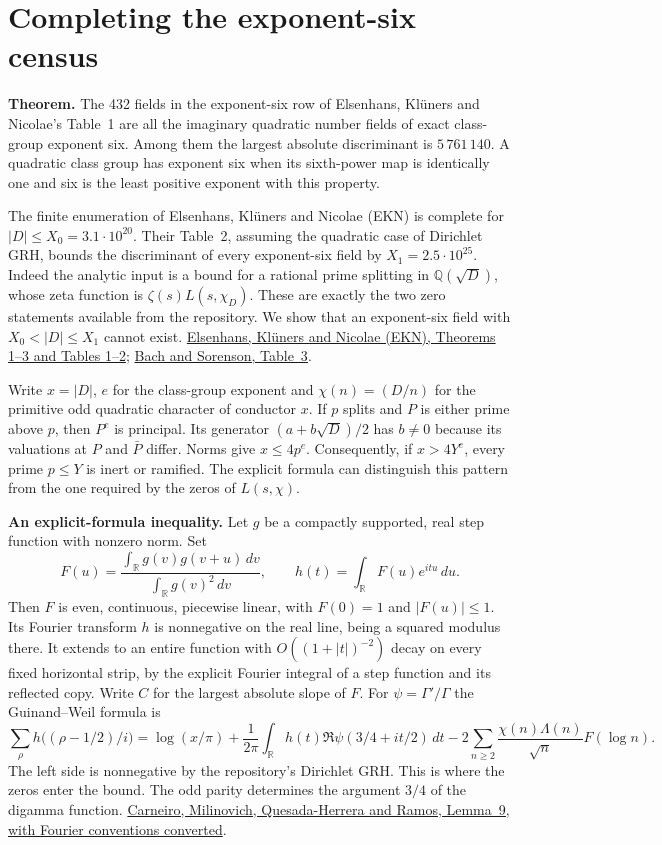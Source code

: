 \section{Completing the exponent-six census}
\label{sec:zero-test}
\textbf{Theorem.} The 432 fields in the exponent-six row of Elsenhans, Kl\"uners and Nicolae's Table~1 are all the imaginary quadratic number fields of exact class-group exponent six. Among them the largest absolute discriminant is $5\,761\,140$. A quadratic class group has exponent six when its sixth-power map is identically one and six is the least positive exponent with this property.

The finite enumeration of Elsenhans, Kl\"uners and Nicolae (EKN) is complete for $|D|\le X_0=3.1\cdot10^{20}$. Their Table~2, assuming the quadratic case of Dirichlet GRH, bounds the discriminant of every exponent-six field by $X_1=2.5\cdot10^{25}$. Indeed the analytic input is a bound for a rational prime splitting in $\mathbb Q(\sqrt D)$, whose zeta function is $\zeta(s)L(s,\chi_D)$. These are exactly the two zero statements available from the repository. We show that an exponent-six field with $X_0<|D|\le X_1$ cannot exist.
\href{https://arxiv.org/pdf/1803.02056}{Elsenhans, Kl\"uners and Nicolae (EKN), Theorems 1--3 and Tables 1--2};
\href{https://doi.org/10.1090/S0025-5718-96-00763-6}{Bach and Sorenson, Table~3}.

Write $x=|D|$, $e$ for the class-group exponent and
$\chi(n)=(D/n)$ for the primitive odd quadratic character of conductor $x$.
If $p$ splits and $P$ is either prime above $p$, then $P^e$ is principal.
Its generator $(a+b\sqrt D)/2$ has $b\ne0$ because its valuations at $P$
and $\bar P$ differ. Norms give $x\le 4p^e$. Consequently, if
$x>4Y^e$, every prime $p\le Y$ is inert or ramified. The explicit
formula can distinguish this pattern from the one required by the zeros
of $L(s,\chi)$.

\medskip\noindent\textbf{An explicit-formula inequality.}
Let $g$ be a compactly supported, real step function with nonzero norm.
Set
\[
 F(u)=\frac{\int_{\mathbb R}g(v)g(v+u)\,dv}{\int_{\mathbb R}g(v)^2\,dv},
 \qquad h(t)=\int_{\mathbb R} F(u)e^{itu}\,du.
\]
Then $F$ is even, continuous, piecewise linear, with $F(0)=1$ and
$|F(u)|\le1$. Its Fourier transform $h$ is nonnegative on the real line,
being a squared modulus there. It extends to an entire function with
$O((1+|t|)^{-2})$ decay on every fixed horizontal strip, by the explicit
Fourier integral of a step function and its reflected copy. Write $C$
for the largest absolute slope of $F$. For $\psi=\Gamma'/\Gamma$ the
Guinand--Weil formula is
\[
 \sum_{\rho}h\big((\rho-1/2)/i\big)=
 \log(x/\pi)+\frac{1}{2\pi}\int_{\mathbb R}h(t)
        \Re\psi(3/4+it/2)\,dt
 -2\sum_{n\ge2}\frac{\chi(n)\Lambda(n)}{\sqrt n}F(\log n).
\]
The left side is nonnegative by the repository's Dirichlet GRH. This is
where the zeros enter the bound. The odd parity determines the argument
$3/4$ of the digamma function.
\href{https://arxiv.org/pdf/2404.08380}{Carneiro, Milinovich,
Quesada-Herrera and Ramos, Lemma~9, with Fourier conventions converted}.

